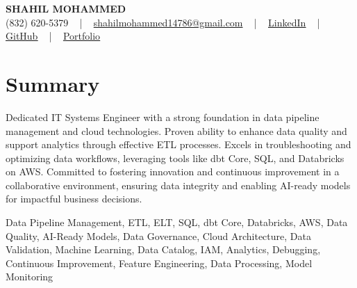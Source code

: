 \documentclass[letterpaper,10pt]{article}
\begin{document}
\begin{center}
    {\fontsize{14pt}{12pt}\selectfont \textbf{\MakeUppercase{Shahil Mohammed}}}\\ \vspace{2pt}
    \fontsize{10pt}{12pt}\selectfont (832) 620-5379 ~ | ~ \href{mailto:shahilmohammed14786@gmail.com}{shahilmohammed14786@gmail.com} ~ | ~  
    \href{https://www.linkedin.com/in/shahil-mohammed-9652931a1/}{\color{blue}\underline{LinkedIn}}  ~ | ~ 
    \href{https://github.com/freakbeast14}{\color{blue}\underline{GitHub}} ~ | ~ 
    \href{https://shahil-mohammed.netlify.app/}{\color{blue}\underline{Portfolio}}
    \vspace{-8pt}
\end{center}

\section{Summary}
\vspace{-2pt}\fontsize{8pt}{9pt}\selectfont
Dedicated IT Systems Engineer with a strong foundation in data pipeline management and cloud technologies. Proven ability to enhance data quality and support analytics through effective ETL processes. Excels in troubleshooting and optimizing data workflows, leveraging tools like dbt Core, SQL, and Databricks on AWS. Committed to fostering innovation and continuous improvement in a collaborative environment, ensuring data integrity and enabling AI-ready models for impactful business decisions. 
\vspace{-5pt}
 
{\fontsize{1pt}{1pt}\selectfont\color{white}
Data Pipeline Management, ETL, ELT, SQL, dbt Core, Databricks, AWS, Data Quality, AI-Ready Models, Data Governance, Cloud Architecture, Data Validation, Machine Learning, Data Catalog, IAM, Analytics, Debugging, Continuous Improvement, Feature Engineering, Data Processing, Model Monitoring
}
\vspace{-8pt}

\vspace{-2pt}
\end{document}
